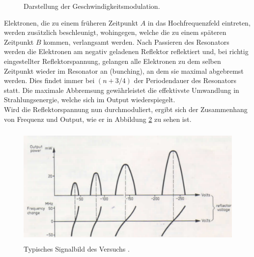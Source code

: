 \begin{figure}
  \centering
  \caption{Darstellung der Geschwindigkeitsmodulation.}
  \label{fig:mod}
\end{figure}

Elektronen, die zu einem früheren Zeitpunkt $A$ in das Hochfrequenzfeld eintreten, werden zusätzlich beschleunigt, wohingegen, welche die zu einem späteren Zeitpunkt $B$ kommen, verlangsamt werden.
Nach Passieren des Resonators werden die Elektronen am negativ geladenen Reflektor reflektiert und, bei richtig eingestellter Reflektorspannung, gelangen alle Elektronen zu dem selben Zeitpunkt wieder im Resonator an (bunching), an dem sie maximal abgebremst werden.
Dies findet immer bei $(n+3/4)$ der Periodendauer des Resonators statt.
Die maximale Abbremsung gewährleistet die effektivste Umwandlung in Strahlungsenergie, welche sich im Output wiederspiegelt.\\
Wird die Reflektorspannung nun durchmoduliert, ergibt sich der Zusammenhang von Frequenz und Output, wie er in Abbildung \ref{fig:output} zu sehen ist.

\begin{figure}
  \centering
  \includegraphics[height=6cm]{ressources/output.png}
  \caption{Typisches Signalbild des Versuchs \cite{skript}.}
  \label{fig:output}
\end{figure}

